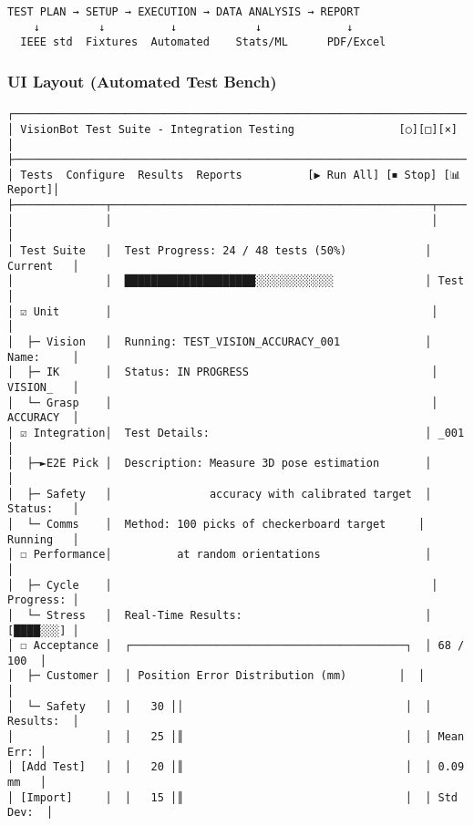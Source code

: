 \documentclass[
]{article}
\begin{document}
\begin{verbatim}
TEST PLAN → SETUP → EXECUTION → DATA ANALYSIS → REPORT
    ↓         ↓          ↓            ↓             ↓
  IEEE std  Fixtures  Automated    Stats/ML      PDF/Excel
\end{verbatim}

\hypertarget{ui-layout-automated-test-bench}{%
\subsubsection{UI Layout (Automated Test
Bench)}\label{ui-layout-automated-test-bench}}

\begin{verbatim}
┌────────────────────────────────────────────────────────────────────────────┐
│ VisionBot Test Suite - Integration Testing                [○][□][×]        │
├────────────────────────────────────────────────────────────────────────────┤
│ Tests  Configure  Results  Reports          [▶ Run All] [⏹ Stop] [📊 Report]│
├──────────────┬─────────────────────────────────────────────────┬───────────┤
│              │                                                 │           │
│ Test Suite   │  Test Progress: 24 / 48 tests (50%)            │ Current   │
│              │  ████████████████████░░░░░░░░░░░░              │ Test      │
│ ☑ Unit       │                                                 │           │
│  ├─ Vision   │  Running: TEST_VISION_ACCURACY_001             │ Name:     │
│  ├─ IK       │  Status: IN PROGRESS                            │ VISION_   │
│  └─ Grasp    │                                                 │ ACCURACY  │
│ ☑ Integration│  Test Details:                                 │ _001      │
│  ├─►E2E Pick │  Description: Measure 3D pose estimation       │           │
│  ├─ Safety   │               accuracy with calibrated target  │ Status:   │
│  └─ Comms    │  Method: 100 picks of checkerboard target     │ Running   │
│ ☐ Performance│          at random orientations                │           │
│  ├─ Cycle    │                                                 │ Progress: │
│  └─ Stress   │  Real-Time Results:                            │ [████░░░] │
│ ☐ Acceptance │  ┌──────────────────────────────────────────┐  │ 68 / 100  │
│  ├─ Customer │  │ Position Error Distribution (mm)        │  │           │
│  └─ Safety   │  │   30 ││                                  │  │ Results:  │
│              │  │   25 │║                                  │  │ Mean Err: │
│ [Add Test]   │  │   20 │║                                  │  │ 0.09 mm   │
│ [Import]     │  │   15 │║                                  │  │ Std Dev:  │

\end{verbatim}
\end{document}
